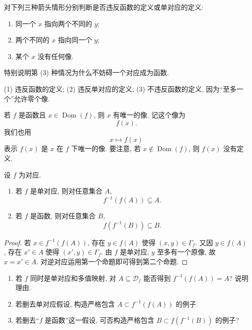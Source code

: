 \documentclass[usesamecnt, thmcnt=section, lang=cn, newtx, 10pt, scheme=chinese]{elegantbook}
\begin{document}
\begin{concept}\label{con:corr-08}
对下列三种箭头情形分别判断是否违反函数的定义或单对应的定义:
\begin{enumerate}[label=\rm(\arabic*)]
  \item 同一个 $x$ 指向两个不同的 $y$;
  \item 两个不同的 $x$ 指向同一个 $y$;
  \item 某个 $x$ 没有任何像.
\end{enumerate}
特别说明第 (3) 种情况为什么不妨碍一个对应成为函数.
\end{concept}

\begin{solution}
(1) 违反函数的定义; (2) 违反单对应的定义; (3) 不违反函数的定义, 因为``至多一个''允许零个像.
\end{solution}

\begin{notation}[函数的值]\label{not:corr-value}
若 $f$ 是函数且 $x\in\operatorname{Dom}(f)$, 则 $x$ 有唯一的像. 记这个像为
\[
 f(x).
\]
我们也用
\[
 x\longmapsto f(x)
\]
表示 $f(x)$ 是 $x$ 在 $f$ 下唯一的像.
要注意, 若 $x\notin\operatorname{Dom}(f)$, 则 $f(x)$ 没有定义.
\end{notation}

\begin{proposition}\label{prop:corr-ffinverse}
设 $f$ 为对应.
\begin{enumerate}[label=\rm(\arabic*)]
  \item 若 $f$ 是单对应, 则对任意集合 $A$,
  \[
   f^{-1}(f(A))\subseteq A.
  \]
  \item 若 $f$ 是函数, 则对任意集合 $B$,
  \[
   f(f^{-1}(B))\subseteq B.
  \]
\end{enumerate}
\end{proposition}

\begin{proof}
若 $x\in f^{-1}(f(A))$, 存在 $y\in f(A)$ 使得 $(x,y)\in\Gamma_f$. 又因 $y\in f(A)$, 存在 $x'\in A$ 使得 $(x',y)\in\Gamma_f$. 由 $f$ 是单对应, $y$ 至多有一个原像, 故 $x=x'\in A$. 对逆对应运用第一个命题即可得到第二个命题.
\end{proof}

\begin{exercise}\label{ex:corr-ffinverse}
\begin{enumerate}[label=\rm(\arabic*)]
  \item 若 $f$ 同时是单对应和多值映射, 对 $A\subseteq\mathscr D_f$ 能否得到 $f^{-1}(f(A))=A$? 说明理由.
  \item 若删去单对应假设, 构造严格包含 $A\subset f^{-1}(f(A))$ 的例子.
  \item 若删去``$f$ 是函数''这一假设, 可否构造严格包含 $B\subset f(f^{-1}(B))$ 的例子? 
\end{enumerate}
\end{exercise}
\end{document}
